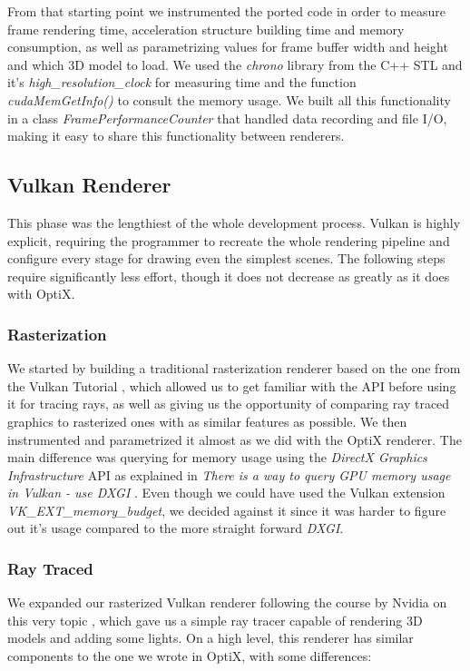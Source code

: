 From that starting point we instrumented the ported code in order to measure frame rendering time, acceleration structure building time and memory consumption, as well as parametrizing values for frame buffer width and height and which 3D model to load. We used the \textit{chrono} library from the C++ STL and it's \textit{high\_resolution\_clock} for measuring time and the function \textit{cudaMemGetInfo()} to consult the memory usage. We built all this functionality in a class \textit{FramePerformanceCounter} that handled data recording and file I/O, making it easy to share this functionality between renderers.

\subsection{Vulkan Renderer}

This phase was the lengthiest of the whole development process. Vulkan is highly explicit, requiring the programmer to recreate the whole rendering pipeline and configure every stage for drawing even the simplest scenes. The following steps require significantly less effort, though it does not decrease as greatly as it does with OptiX.

\subsubsection{Rasterization}
We started by building a traditional rasterization renderer based on the one from the Vulkan Tutorial \cite{VulkanTutorial}, which allowed us to get familiar with the API before using it for tracing rays, as well as giving us the opportunity of comparing ray traced graphics to rasterized ones with as similar features as possible. We then instrumented and parametrized it almost as we did with the OptiX renderer. The main difference was querying for memory usage using the \textit{DirectX Graphics Infrastructure} API \cite{DXGI} as explained in \textit{There is a way to query GPU memory usage in Vulkan - use DXGI} \cite{GpuMemUsageVulkan}. Even though we could have used the Vulkan extension \textit{VK\_EXT\_memory\_budget}, we decided against it since it was harder to figure out it's usage compared to the more straight forward \textit{DXGI}.

\subsubsection{Ray Traced}
We expanded our rasterized Vulkan renderer following the course by Nvidia on this very topic \cite{VulkanRaytracingTutorial}, which gave us a simple ray tracer capable of rendering 3D models and adding some lights. On a high level, this renderer has similar components to the one we wrote in OptiX, with some differences:

